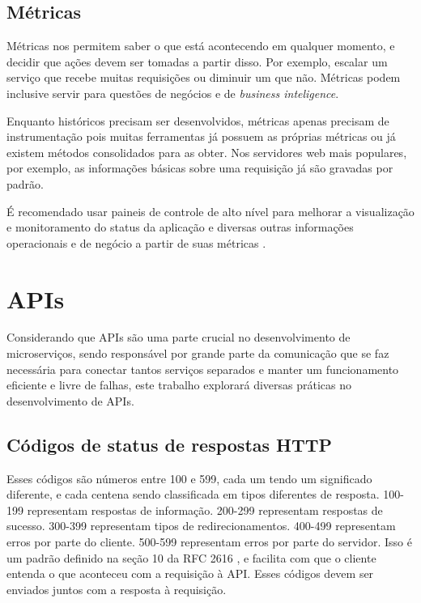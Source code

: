 
\subsection{Métricas}
Métricas nos permitem saber o que está acontecendo em qualquer momento, e decidir que ações devem ser tomadas a partir disso. Por exemplo, escalar um serviço que recebe muitas requisições ou diminuir um que não. Métricas podem inclusive servir para questões de negócios e de \emph{business inteligence}. 

Enquanto históricos precisam ser desenvolvidos, métricas apenas precisam de instrumentação pois muitas ferramentas já possuem as próprias métricas ou já existem métodos consolidados para as obter. Nos servidores web mais populares, por exemplo, as informações básicas sobre uma requisição já são gravadas por padrão.

É recomendado usar paineis de controle de alto nível para melhorar a visualização e monitoramento do status da aplicação e diversas outras informações operacionais e de negócio a partir de suas métricas \cite{martin-fowler-microservices}.

\section{APIs}\label{boas-praticas-apis}

Considerando que APIs são uma parte crucial no desenvolvimento de microserviços, sendo responsável por grande parte da comunicação que se faz necessária para conectar tantos serviços separados e manter um funcionamento eficiente e livre de falhas, este trabalho explorará diversas práticas no desenvolvimento de APIs.

\subsection{Códigos de status de respostas HTTP}
Esses códigos são números entre 100 e 599, cada um tendo um significado diferente, e cada centena sendo classificada em tipos diferentes de resposta. 100-199 representam respostas de informação. 200-299 representam respostas de sucesso. 300-399 representam tipos de redirecionamentos. 400-499 representam erros por parte do cliente. 500-599 representam erros por parte do servidor. Isso é um padrão definido na seção 10 da RFC 2616 \cite{rfc_http_nielsen_1999}, e facilita com que o cliente entenda o que aconteceu com a requisição à API. Esses códigos devem ser enviados juntos com a resposta à requisição.

